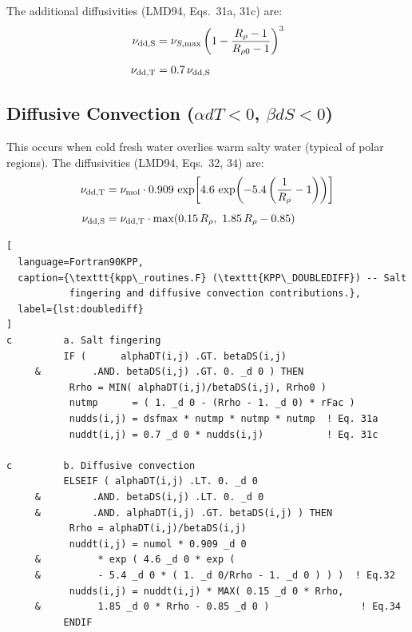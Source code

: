 \documentclass[12pt,letterpaper]{article}
\begin{document}
The additional diffusivities (LMD94, Eqs.\ 31a, 31c) are:  
\begin{align}  
\nu_{\rm dd,S} &= \nu_{S,\rm max}\left(1 - \frac{R_\rho - 1}  
                                               {R_{\rho 0} - 1}\right)^3 \\[4pt]  
\nu_{\rm dd,T} &= 0.7\,\nu_{\rm dd,S}  
\end{align}  
  
\subsection{Diffusive Convection ($\alpha dT < 0$, $\beta dS < 0$)}  
  
This occurs when cold fresh water overlies warm salty water (typical of  
polar regions). The diffusivities (LMD94, Eqs.\ 32, 34) are:  
\begin{align}  
\nu_{\rm dd,T} &= \nu_{\rm mol}\cdot 0.909\,\exp\!\left[4.6\,  
  \exp\!\left(-5.4\left(\frac{1}{R_\rho} - 1\right)\right)\right] \\[4pt]  
\nu_{\rm dd,S} &= \nu_{\rm dd,T}\cdot\max\!\left(0.15\,R_\rho,\  
  1.85\,R_\rho - 0.85\right)  
\end{align}  
  
\begin{lstlisting}[  
  language=Fortran90KPP,  
  caption={\texttt{kpp\_routines.F} (\texttt{KPP\_DOUBLEDIFF}) -- Salt  
           fingering and diffusive convection contributions.},  
  label={lst:doublediff}  
]  
c         a. Salt fingering  
          IF (      alphaDT(i,j) .GT. betaDS(i,j)  
     &         .AND. betaDS(i,j) .GT. 0. _d 0 ) THEN  
           Rrho = MIN( alphaDT(i,j)/betaDS(i,j), Rrho0 )  
           nutmp      = ( 1. _d 0 - (Rrho - 1. _d 0) * rFac )  
           nudds(i,j) = dsfmax * nutmp * nutmp * nutmp  ! Eq. 31a  
           nuddt(i,j) = 0.7 _d 0 * nudds(i,j)           ! Eq. 31c  
  
c         b. Diffusive convection  
          ELSEIF ( alphaDT(i,j) .LT. 0. _d 0  
     &         .AND. betaDS(i,j) .LT. 0. _d 0  
     &         .AND. alphaDT(i,j) .GT. betaDS(i,j) ) THEN  
           Rrho = alphaDT(i,j)/betaDS(i,j)  
           nuddt(i,j) = numol * 0.909 _d 0  
     &          * exp ( 4.6 _d 0 * exp (  
     &          - 5.4 _d 0 * ( 1. _d 0/Rrho - 1. _d 0 ) ) )  ! Eq.32  
           nudds(i,j) = nuddt(i,j) * MAX( 0.15 _d 0 * Rrho,  
     &          1.85 _d 0 * Rrho - 0.85 _d 0 )                ! Eq.34  
          ENDIF  
\end{lstlisting}  
  
\end{document}
